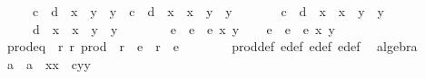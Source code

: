 \begin{isabellebody}
\ \ \ \ \ c{\isacharcircum}{}\ {\isacharasterisk}\ d\ {\isacharasterisk}\ x{}{\isacharcircum}{}\ {\isacharasterisk}\ y{}{\isacharcircum}{}\ {\isacharasterisk}\ y{}{\isacharcircum}{}\ {\isacharplus}\ c\ {\isacharasterisk}\ d{\isacharcircum}{}\ {\isacharasterisk}\ x{}{\isacharcircum}{}\ {\isacharasterisk}\ x{}{\isacharcircum}{}\ {\isacharasterisk}\ y{}{\isacharcircum}{}\ {\isacharasterisk}\ y{}{\isacharcircum}{}\ {\isacharplus}\ \isanewline
\ \ \ \ \ c{\isacharcircum}{}\ {\isacharasterisk}\ d{\isacharcircum}{}\ {\isacharasterisk}\ x{}{\isacharcircum}{}\ {\isacharasterisk}\ x{}{\isacharcircum}{}\ {\isacharasterisk}\ y{}{\isacharcircum}{}\ {\isacharasterisk}\ y{}{\isacharcircum}{}\ {\isacharminus}\ \isanewline
\ \ \ \ \ d{\isacharcircum}{}\ {\isacharasterisk}\ x{}{\isacharcircum}{}\ {\isacharasterisk}\ x{}{\isacharcircum}{}\ {\isacharasterisk}\ y{}{\isacharcircum}{}\ {\isacharasterisk}\ y{}{\isacharcircum}{}{\isachardoublequoteclose}\ \ \ \ \isanewline
\isanewline
\ \ \isamarkupfalse%
\ e{}\ \ {\isachardoublequoteopen}e{}\ {\isacharequal}\ e\ x{}\ y{}{\isachardoublequoteclose}\isanewline
\ \ \isamarkupfalse%
\ e{}\ \ {\isachardoublequoteopen}e{}\ {\isacharequal}\ e\ x{}\ y{}{\isachardoublequoteclose}\isanewline
\isanewline
\isanewline
\ \ \isamarkupfalse%
\ prod{\isacharunderscore}eq{\isacharunderscore}{}{\isacharcolon}\ {\isachardoublequoteopen}{\isasymexists}\ r{}\ r{}{\isachardot}\ prod\ {\isacharminus}\ {\isacharparenleft}r{}\ {\isacharasterisk}\ e{}\ {\isacharplus}\ r{}\ {\isacharasterisk}\ e{}{\isacharparenright}\ {\isacharequal}\ {}{\isachardoublequoteclose}\isanewline
\ \ \ \ \isamarkupfalse%
\ prod{\isacharunderscore}def\ e{}{\isacharunderscore}def\ e{}{\isacharunderscore}def\ e{\isacharunderscore}def\ \isamarkupfalse%
\ algebra\isanewline
\isanewline
\ \ \isamarkupfalse%
\ a\ \ {\isachardoublequoteopen}a\ {\isacharequal}\ x{}{\isacharasterisk}x{}\ {\isacharminus}\ c{\isacharasterisk}y{}{\isacharasterisk}y{}{\isachardoublequoteclose}\isanewline

\end{isabellebody}
